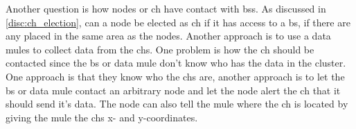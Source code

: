 \documentclass[USenglish]{uit-thesis}
\begin{document}
Another question is how nodes or \gls{ch} have contact with \glspl{bs}. As discussed in \autoref{disc:ch_election}, can a node be elected as \gls{ch} if it has access to a \gls{bs}, if there are any placed in the same area as the nodes. Another approach is to use a data mules to collect data from the \glspl{ch}.
One problem is how the \gls{ch} should be contacted since the \gls{bs} or data mule don't know who has the data in the cluster. One approach is that they know who the \glspl{ch} are, another approach is to let the \gls{bs} or data mule contact an arbitrary node and let the node alert the \gls{ch} that it should send it's data. The node can also tell the mule where the \gls{ch} is located by giving the mule the \glspl{ch} x- and y-coordinates.








\end{document}
